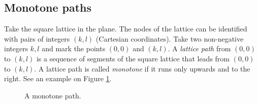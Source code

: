 

\setcounter{section}{3}
\setcounter{subsection}{2}
\setcounter{dfn}{3}

\subsection{Monotone paths}
Take the square lattice in the plane.
The nodes of the lattice can be identified with pairs of integers $(k,l)$ (Cartesian coordinates).
Take two non-negative integers $k, l$ and mark the points $(0,0)$ and $(k,l)$.
A \emph{lattice path} from $(0,0)$ to $(k,l)$ is a sequence of segments of the square lattice
that leads from $(0,0)$ to $(k,l)$.
A lattice path is called \emph{monotone} if it runs only upwards and to the right.
See an example on Figure \ref{fig:MonPath}.

\begin{figure}[htb]
\begin{center}

\end{center}
\caption{A monotone path.}
\label{fig:MonPath}
\end{figure}


